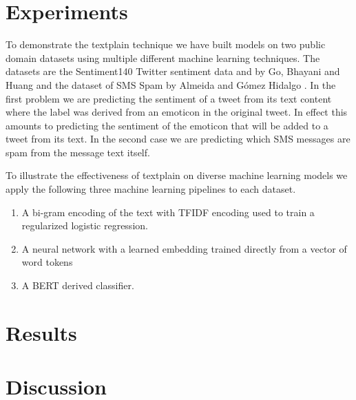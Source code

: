 \documentclass[12pt,a4paper]{article}
\numberwithin{equation}{section}
\begin{document}
\section{Experiments}

To demonstrate the textplain technique we have built models on two public domain datasets using multiple different machine learning techniques.
The datasets are the Sentiment140 Twitter sentiment data and by Go, Bhayani and
Huang \cite{Go2009} and the dataset of SMS Spam by Almeida and Gómez Hidalgo \cite{Almeida2011}. 
In the first problem we are predicting the sentiment of a tweet from its text content where the label was derived from an emoticon in the 
original tweet. In effect this amounts to predicting the sentiment of the emoticon that will be added to a tweet from its text.
In the second case we are predicting which SMS messages are spam from the message text itself.

To illustrate the effectiveness of textplain on diverse machine learning models we apply the following three
machine learning pipelines to each dataset.

\begin{enumerate}
   \item A bi-gram encoding of the text with TFIDF encoding used to train a regularized logistic regression.
   \item A neural network with a learned embedding trained directly from a vector of word tokens 
   \item A BERT derived classifier.
\end{enumerate}
  



\section{Results}


\section{Discussion}




\end{document}
